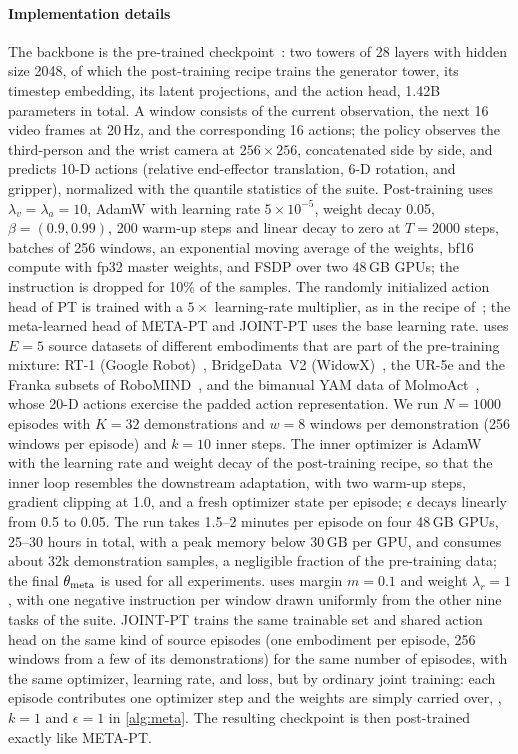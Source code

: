 \paragraph{Implementation details}
The backbone is the pre-trained \base checkpoint~\cite{cosmos3}: two towers of 28 layers with hidden size 2048, of which the post-training recipe trains the generator tower, its timestep embedding, its latent projections, and the action head, 1.42B parameters in total.
A window consists of the current observation, the next 16 video frames at 20\,Hz, and the corresponding 16 actions; the policy observes the third-person and the wrist camera at $256{\times}256$, concatenated side by side, and predicts 10-D actions (relative end-effector translation, 6-D rotation, and gripper), normalized with the quantile statistics of the suite.
Post-training uses $\lambda_v=\lambda_a=10$, AdamW with learning rate $5{\times}10^{-5}$, weight decay 0.05, $\beta=(0.9,0.99)$, 200 warm-up steps and linear decay to zero at $T{=}2000$ steps, batches of 256 windows, an exponential moving average of the weights, bf16 compute with fp32 master weights, and FSDP over two 48\,GB GPUs; the instruction is dropped for 10\% of the samples.
The randomly initialized action head of PT is trained with a $5\times$ learning-rate multiplier, as in the recipe of~\cite{cosmos3}; the meta-learned head of META-PT and JOINT-PT uses the base learning rate.
\Method uses $E{=}5$ source datasets of different embodiments that are part of the pre-training mixture: RT-1 (Google Robot)~\cite{brohan2023rt1}, BridgeData~V2 (WidowX)~\cite{walke2023bridge}, the UR-5e and the Franka subsets of RoboMIND~\cite{wu2024robomind}, and the bimanual YAM data of MolmoAct~\cite{lee2025molmoact}, whose 20-D actions exercise the padded action representation.
We run $N{=}1000$ episodes with $K{=}32$ demonstrations and $w{=}8$ windows per demonstration (256 windows per episode) and $k{=}10$ inner steps.
The inner optimizer is AdamW with the learning rate and weight decay of the post-training recipe, so that the inner loop resembles the downstream adaptation, with two warm-up steps, gradient clipping at 1.0, and a fresh optimizer state per episode; $\epsilon$ decays linearly from 0.5 to 0.05.
The run takes 1.5--2 minutes per episode on four 48\,GB GPUs, 25--30 hours in total, with a peak memory below 30\,GB per GPU, and consumes about 32k demonstration samples, a negligible fraction of the pre-training data; the final $\theta_{\mathrm{meta}}$ is used for all experiments.
\RPL uses margin $m{=}0.1$ and weight $\lambda_r{=}1$, with one negative instruction per window drawn uniformly from the other nine tasks of the suite.
JOINT-PT trains the same trainable set and shared action head on the same kind of source episodes (one embodiment per episode, 256 windows from a few of its demonstrations) for the same number of episodes, with the same optimizer, learning rate, and loss, but by ordinary joint training: each episode contributes one optimizer step and the weights are simply carried over, \ie, $k{=}1$ and $\epsilon{=}1$ in \cref{alg:meta}.
The resulting checkpoint is then post-trained exactly like META-PT.

